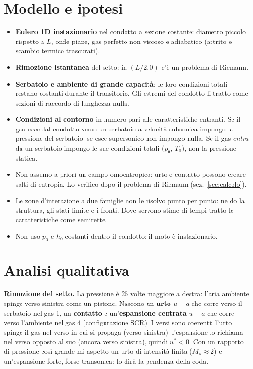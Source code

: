 \documentclass[11pt,a4paper]{article}
\newcommand{\uma}{u-a}
\newcommand{\upa}{u+a}
\newcommand{\Ms}{M_{s}}
\begin{document}
\section{Modello e ipotesi}
\begin{itemize}
\item \textbf{Eulero 1D instazionario} nel condotto a sezione costante: diametro piccolo rispetto a $L$, onde
  piane, gas perfetto non viscoso e adiabatico (attrito e scambio termico trascurati).
\item \textbf{Rimozione istantanea} del setto: in $(L/2,0)$ c'è un problema di Riemann.
\item \textbf{Serbatoio e ambiente di grande capacità}: le loro condizioni totali restano costanti durante il
  transitorio. Gli estremi del condotto li tratto come sezioni di raccordo di lunghezza nulla.
\item \textbf{Condizioni al contorno} in numero pari alle caratteristiche entranti. Se il gas \emph{esce} dal
  condotto verso un serbatoio a velocità subsonica impongo la pressione del serbatoio; se esce supersonico non
  impongo nulla. Se il gas \emph{entra} da un serbatoio impongo le sue condizioni totali ($p_0$, $T_0$), non la
  pressione statica.
\item Non assumo a priori un campo omoentropico: urto e contatto possono creare salti di entropia. Lo verifico
  dopo il problema di Riemann (sez.~\ref{sec:calcolo}).
\item Le zone d'interazione a due famiglie non le risolvo punto per punto: ne do la struttura, gli stati
  limite e i fronti. Dove servono stime di tempi tratto le caratteristiche come semirette.
\item Non uso $p_0$ e $h_0$ costanti dentro il condotto: il moto è instazionario.
\end{itemize}

\section{Analisi qualitativa}
\textbf{Rimozione del setto.} La pressione è 25 volte maggiore a destra: l'aria ambiente spinge verso sinistra
come un pistone. Nascono un \textbf{urto $\uma$} che corre verso il serbatoio nel gas 1, un \textbf{contatto} e
un'\textbf{espansione centrata $\upa$} che corre verso l'ambiente nel gas 4 (configurazione SCR). I versi sono
coerenti: l'urto spinge il gas nel verso in cui si propaga (verso sinistra), l'espansione lo richiama nel verso
opposto al suo (ancora verso sinistra), quindi $u^*<0$. Con un rapporto di pressione così grande mi aspetto un urto
di intensità finita ($\Ms\approx2$) e un'espansione forte, forse transonica: lo dirà la pendenza della coda.
\end{document}
